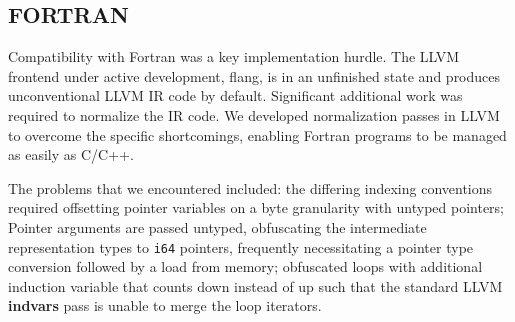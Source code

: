 

\subsection{FORTRAN}
Compatibility with Fortran was a key implementation hurdle. 
The LLVM frontend under active development, flang, is in an unfinished state and
produces unconventional LLVM IR code by default.
Significant additional work was required to normalize the IR code.
We developed normalization passes in LLVM to overcome the specific
shortcomings, enabling Fortran programs to be managed as easily as C/C++.

    The problems that we encountered included: the differing indexing
    conventions required offsetting pointer variables on a byte granularity with
    untyped pointers;
    Pointer arguments are passed untyped, obfuscating the intermediate
    representation types to \texttt{i64} pointers, frequently necessitating a
    pointer type conversion followed by a load from memory;
    obfuscated loops with additional induction variable that counts down instead
    of up such that the standard LLVM \textbf{indvars} pass is unable to merge
    the loop iterators.


